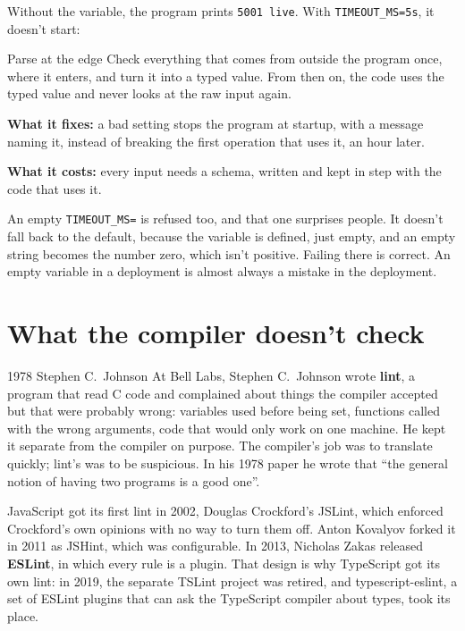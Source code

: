 Without the variable, the program prints \texttt{5001 live}. With
\texttt{TIMEOUT\_MS=5s}, it doesn't start:


\begin{concept}{Parse at the edge}
Check everything that comes from outside the program once, where it enters,
and turn it into a typed value. From then on, the code uses the typed value and
never looks at the raw input again.

\textbf{What it fixes:} a bad setting stops the program at startup, with a
message naming it, instead of breaking the first operation that uses it, an
hour later.

\textbf{What it costs:} every input needs a schema, written and kept in step
with the code that uses it.
\end{concept}

An empty \texttt{TIMEOUT\_MS=} is refused too, and that one surprises people.
It doesn't fall back to the default, because the variable is defined, just
empty, and an empty string becomes the number zero, which isn't positive.
Failing there is correct. An empty variable in a deployment is almost always a
mistake in the deployment.

\section{What the compiler doesn't check}

\begin{history}{1978 \textperiodcentered{} Stephen C.\ Johnson}
At Bell Labs, Stephen C.\ Johnson wrote \textbf{lint}, a program that read C
code and complained about things the compiler accepted but that were probably
wrong: variables used before being set, functions called with the wrong
arguments, code that would only work on one machine. He kept it separate from
the compiler on purpose. The compiler's job was to translate quickly; lint's
was to be suspicious. In his 1978 paper he wrote that ``the general notion of
having two programs is a good one''.

JavaScript got its first lint in 2002, Douglas Crockford's JSLint, which
enforced Crockford's own opinions with no way to turn them off. Anton
Kovalyov forked it in 2011 as JSHint, which was configurable. In 2013, Nicholas
Zakas released \textbf{ESLint}, in which every rule is a plugin. That design
is why TypeScript got its own lint: in 2019, the separate TSLint project was
retired, and typescript-eslint, a set of ESLint plugins that can ask the
TypeScript compiler about types, took its place.
\end{history}

